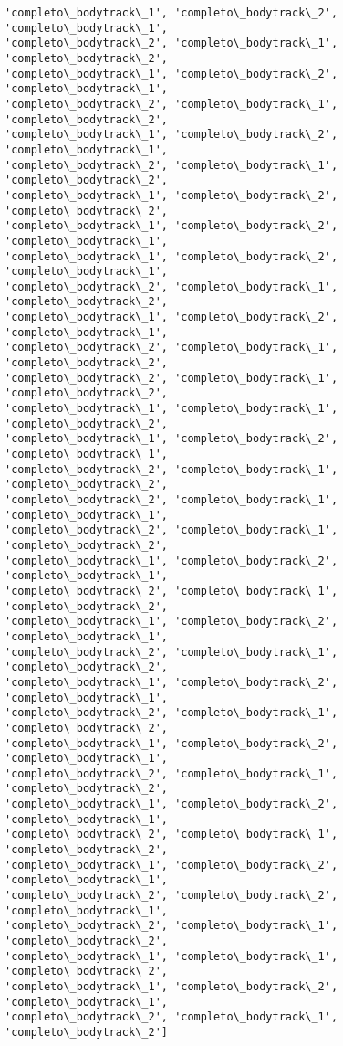 \documentclass[11pt]{article}
\begin{document}
\begin{Verbatim}[commandchars=\\\{\}]
'completo\_bodytrack\_1', 'completo\_bodytrack\_2', 'completo\_bodytrack\_1',
'completo\_bodytrack\_2', 'completo\_bodytrack\_1', 'completo\_bodytrack\_2',
'completo\_bodytrack\_1', 'completo\_bodytrack\_2', 'completo\_bodytrack\_1',
'completo\_bodytrack\_2', 'completo\_bodytrack\_1', 'completo\_bodytrack\_2',
'completo\_bodytrack\_1', 'completo\_bodytrack\_2', 'completo\_bodytrack\_1',
'completo\_bodytrack\_2', 'completo\_bodytrack\_1', 'completo\_bodytrack\_2',
'completo\_bodytrack\_1', 'completo\_bodytrack\_2', 'completo\_bodytrack\_2',
'completo\_bodytrack\_1', 'completo\_bodytrack\_2', 'completo\_bodytrack\_1',
'completo\_bodytrack\_1', 'completo\_bodytrack\_2', 'completo\_bodytrack\_1',
'completo\_bodytrack\_2', 'completo\_bodytrack\_1', 'completo\_bodytrack\_2',
'completo\_bodytrack\_1', 'completo\_bodytrack\_2', 'completo\_bodytrack\_1',
'completo\_bodytrack\_2', 'completo\_bodytrack\_1', 'completo\_bodytrack\_2',
'completo\_bodytrack\_2', 'completo\_bodytrack\_1', 'completo\_bodytrack\_2',
'completo\_bodytrack\_1', 'completo\_bodytrack\_1', 'completo\_bodytrack\_2',
'completo\_bodytrack\_1', 'completo\_bodytrack\_2', 'completo\_bodytrack\_1',
'completo\_bodytrack\_2', 'completo\_bodytrack\_1', 'completo\_bodytrack\_2',
'completo\_bodytrack\_2', 'completo\_bodytrack\_1', 'completo\_bodytrack\_1',
'completo\_bodytrack\_2', 'completo\_bodytrack\_1', 'completo\_bodytrack\_2',
'completo\_bodytrack\_1', 'completo\_bodytrack\_2', 'completo\_bodytrack\_1',
'completo\_bodytrack\_2', 'completo\_bodytrack\_1', 'completo\_bodytrack\_2',
'completo\_bodytrack\_1', 'completo\_bodytrack\_2', 'completo\_bodytrack\_1',
'completo\_bodytrack\_2', 'completo\_bodytrack\_1', 'completo\_bodytrack\_2',
'completo\_bodytrack\_1', 'completo\_bodytrack\_2', 'completo\_bodytrack\_1',
'completo\_bodytrack\_2', 'completo\_bodytrack\_1', 'completo\_bodytrack\_2',
'completo\_bodytrack\_1', 'completo\_bodytrack\_2', 'completo\_bodytrack\_1',
'completo\_bodytrack\_2', 'completo\_bodytrack\_1', 'completo\_bodytrack\_2',
'completo\_bodytrack\_1', 'completo\_bodytrack\_2', 'completo\_bodytrack\_1',
'completo\_bodytrack\_2', 'completo\_bodytrack\_1', 'completo\_bodytrack\_2',
'completo\_bodytrack\_1', 'completo\_bodytrack\_2', 'completo\_bodytrack\_1',
'completo\_bodytrack\_2', 'completo\_bodytrack\_2', 'completo\_bodytrack\_1',
'completo\_bodytrack\_2', 'completo\_bodytrack\_1', 'completo\_bodytrack\_2',
'completo\_bodytrack\_1', 'completo\_bodytrack\_1', 'completo\_bodytrack\_2',
'completo\_bodytrack\_1', 'completo\_bodytrack\_2', 'completo\_bodytrack\_1',
'completo\_bodytrack\_2', 'completo\_bodytrack\_1', 'completo\_bodytrack\_2']

\end{Verbatim}
\end{document}
